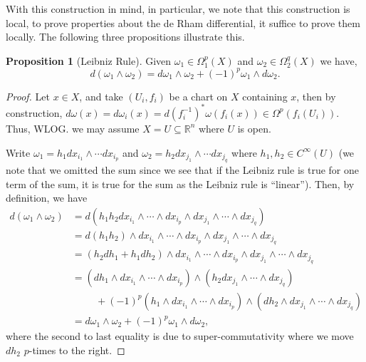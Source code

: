 \documentclass[]{article}
\theoremstyle{definition}
\theoremstyle{definition}
\newtheorem{proposition}{Proposition}[section]
\begin{document}
With this construction in mind, in particular, we note that this construction 
is local, to prove properties about the de Rham differential, it suffice to 
prove them locally. The following three propositions illustrate this.

\begin{proposition}[Leibniz Rule]
  Given \(\omega_1 \in \Omega_1^p(X)\) and \(\omega_2 \in \Omega_2^q(X)\)
  we have,
  \[d(\omega_1 \wedge \omega_2) = d\omega_1 \wedge \omega_2 + (-1)^p \omega_1 
    \wedge d\omega_2.\]
\end{proposition}
\begin{proof}
  Let \(x \in X\), and take \((U_i, f_i)\) be a chart on \(X\) containing \(x\), 
  then by construction, \(d\omega(x) = d\omega_i(x) = d(f_i^{-1})^* \omega(f_i(x)) 
  \in \Omega^p(f_i(U_i))\).
  Thus, WLOG. we may assume \(X = U \subseteq \mathbb{R}^n\) where \(U\) is open.

  Write \(\omega_1 = h_1 dx_{i_1} \wedge \cdots dx_{i_p}\) and 
  \(\omega_2 = h_2 dx_{j_1} \wedge \cdots dx_{j_q}\) where \(h_1, h_2 \in C^\infty(U)\) 
  (we note that we omitted the sum since we see that if the Leibniz rule is 
  true for one term of the sum, it is true for the sum as the Leibniz rule 
  is ``linear''). Then, by definition, we have 
  \[\begin{split}
    d(\omega_1 \wedge \omega_2) &= d(h_1 h_2 dx_{i_1} \wedge \cdots \wedge dx_{i_p} 
      \wedge dx_{j_1} \wedge \cdots \wedge dx_{j_q})\\ 
      & = d(h_1 h_2) \wedge dx_{i_1} \wedge \cdots \wedge dx_{i_p} 
      \wedge dx_{j_1} \wedge \cdots \wedge dx_{j_q}\\
      & = (h_2 dh_1 + h_1 dh_2) \wedge dx_{i_1} \wedge \cdots \wedge dx_{i_p}
      \wedge dx_{j_1} \wedge \cdots \wedge dx_{j_q}\\
      & = (dh_1 \wedge dx_{i_1} \wedge \cdots \wedge dx_{i_p}) \wedge
        (h_2 dx_{j_1} \wedge \cdots \wedge dx_{j_q})\\
        & \hspace{1cm} + 
        (-1)^p(h_1 \wedge dx_{i_1} \wedge \cdots \wedge dx_{i_p}) \wedge
        (dh_2 \wedge dx_{j_1} \wedge \cdots \wedge dx_{j_q})\\
      & = d\omega_1 \wedge \omega_2 + (-1)^p \omega_1 \wedge d\omega_2,
  \end{split}\]
  where the second to last equality is due to super-commutativity where 
  we move \(dh_2\) \(p\)-times to the right. 
\end{proof}
\end{document}
